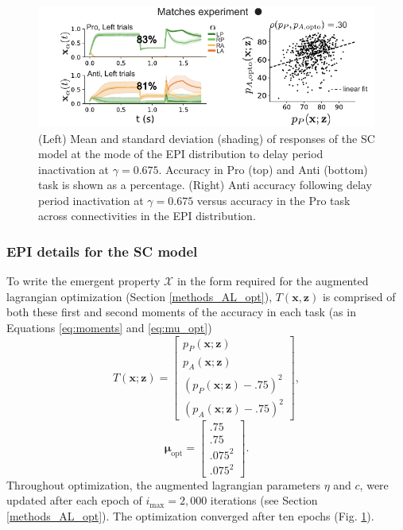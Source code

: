 \documentclass[11pt]{article}
\begin{document}
\begin{figure}
\begin{center}
\includegraphics[scale=1.2]{figures/figSC6/figSC6.pdf}
\end{center}
\caption{
(Left) Mean and standard deviation (shading) of responses of the SC model at the mode of the EPI distribution to delay period inactivation at $\gamma = 0.675$. Accuracy in Pro (top) and Anti (bottom) task is shown as a percentage. (Right) Anti accuracy following delay period inactivation at $\gamma = 0.675$ versus accuracy in the Pro task across connectivities in the EPI distribution.
}
\label{fig:SC6}
\end{figure}

\subsubsection{EPI details for the SC model} \label{methods_sc_epi}
To write the emergent property $\mathcal{X}$ in the form required for the augmented lagrangian optimization (Section \ref{methods_AL_opt}), $T(\mathbf{x}, \mathbf{z})$ is comprised of both these first and second moments of the accuracy in each task (as in Equations \ref{eq:moments} and \ref{eq:mu_opt})
\begin{equation} 
T(\mathbf{x}; \mathbf{z}) = \begin{bmatrix} p_P(\mathbf{x}; \mathbf{z}) \\ p_A(\mathbf{x}; \mathbf{z}) \\ \left(p_P(\mathbf{x}; \mathbf{z}) - .75 \right)^2 \\ \left(p_A(\mathbf{x}; \mathbf{z}) - .75 \right)^2 \end{bmatrix},
\end{equation}
\begin{equation} 
\bm{\mu}_{\text{opt}} = \begin{bmatrix} .75 \\ .75 \\ .075^2 \\ .075^2 \end{bmatrix}.
\end{equation}
Throughout optimization, the augmented lagrangian parameters $\eta$ and $c$, were updated after each epoch of $i_{\text{max}} = 2,000$ iterations (see Section \ref{methods_AL_opt}).  
The optimization converged after ten epochs (Fig. \ref{fig:SC6}).
\end{document}
